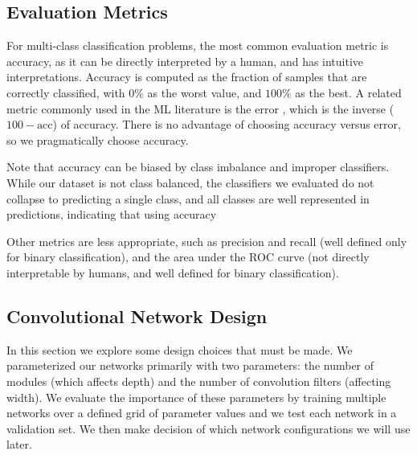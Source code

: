 \subsection{Evaluation Metrics}

For multi-class classification problems, the most common evaluation metric is accuracy, as it can be directly interpreted by a human, and has intuitive interpretations. Accuracy is computed as the fraction of samples that are correctly classified, with $0 \%$ as the worst value, and $100 \%$ as the best. A related metric commonly used in the ML literature is the error \cite[2em]{Goodfellow2016deep}, which is the inverse ($100 - \text{acc}$) of accuracy. There is no advantage of choosing accuracy versus error, so we pragmatically choose accuracy.

Note that accuracy can be biased by class imbalance and improper classifiers. While our dataset is not class balanced, the classifiers we evaluated do not collapse to predicting a single class, and all classes are well represented in predictions, indicating that using accuracy

Other metrics are less appropriate, such as precision and recall (well defined only for binary classification), and the area under the ROC curve (not directly interpretable by humans, and well defined for binary classification).

\subsection{Convolutional Network Design}
\label{sic:cnnDesignSection}
               
In this section we explore some design choices that must be made. We parameterized our networks primarily with two parameters: the number of modules (which affects depth) and the number of convolution filters (affecting width). We evaluate the importance of these parameters by training multiple networks over a defined grid of parameter values and we test each network in a validation set. We then make decision of which network configurations we will use later.

